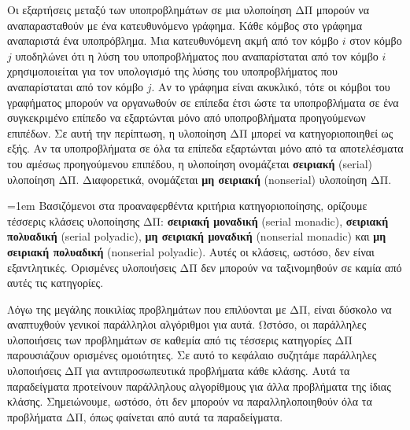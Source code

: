 \documentclass[12pt,a4paper]{article} %
\begin{document}
{{Οι εξαρτήσεις μεταξύ των υποπροβλημάτων σε μια υλοποίηση ΔΠ μπορούν να αναπαρασταθούν με ένα κατευθυνόμενο γράφημα. 
Κάθε κόμβος στο γράφημα αναπαριστά ένα υποπρόβλημα. Μια κατευθυνόμενη ακμή από τον κόμβο $i$ στον κόμβο $j$ υποδηλώνει 
ότι η λύση του υποπροβλήματος που αναπαρίσταται από τον κόμβο $i$ χρησιμοποιείται για τον υπολογισμό της λύσης του 
υποπροβλήματος που αναπαρίσταται από τον κόμβο $j$. Αν το γράφημα είναι ακυκλικό, τότε οι κόμβοι του γραφήματος μπορούν να 
οργανωθούν σε επίπεδα έτσι ώστε τα υποπροβλήματα σε ένα συγκεκριμένο επίπεδο 
να εξαρτώνται μόνο από υποπροβλήματα προηγούμενων επιπέδων. Σε
αυτή την περίπτωση, η υλοποίηση ΔΠ μπορεί να κατηγοριοποιηθεί ως
εξής. Αν τα υποπροβλήματα σε όλα τα επίπεδα εξαρτώνται μόνο από τα
αποτελέσματα του αμέσως προηγούμενου επιπέδου, η υλοποίηση ονομάζεται
\textbf{σειριακή} (serial) υλοποίηση ΔΠ. Διαφορετικά, ονομάζεται
\textbf{μη σειριακή} (nonserial) υλοποίηση ΔΠ.
{\emergencystretch=1em
Βασιζόμενοι στα προαναφερθέντα κριτήρια κατηγοριοποίησης, ορίζουμε
τέσσερις κλάσεις υλοποίησης ΔΠ: \textbf{σειριακή μοναδική} (serial monadic),
\textbf{σειριακή πολυαδική} (serial polyadic), \textbf{μη σειριακή μοναδική} (nonserial monadic) και
\textbf{μη σειριακή πολυαδική} (nonserial polyadic). Αυτές οι κλάσεις, ωστόσο, δεν είναι
εξαντλητικές. Ορισμένες υλοποιήσεις ΔΠ δεν μπορούν να ταξινομηθούν
σε καμία από αυτές τις κατηγορίες. \par}

Λόγω της μεγάλης ποικιλίας προβλημάτων που επιλύονται με ΔΠ, είναι
δύσκολο να αναπτυχθούν γενικοί παράλληλοι αλγόριθμοι για αυτά.
Ωστόσο, οι παράλληλες υλοποιήσεις των προβλημάτων σε καθεμία από τις
τέσσερις κατηγορίες ΔΠ παρουσιάζουν ορισμένες ομοιότητες. Σε αυτό
το κεφάλαιο συζητάμε παράλληλες υλοποιήσεις ΔΠ για αντιπροσωπευτικά
προβλήματα κάθε κλάσης. Αυτά τα παραδείγματα προτείνουν παράλληλους
αλγορίθμους για άλλα προβλήματα της ίδιας κλάσης. Σημειώνουμε,
ωστόσο, ότι δεν μπορούν να παραλληλοποιηθούν όλα τα προβλήματα ΔΠ,
όπως φαίνεται από αυτά τα παραδείγματα.
\vspace{0.3cm}

\begin{figure}[H]
\centering
{}
\end{figure}}}
\end{document}
